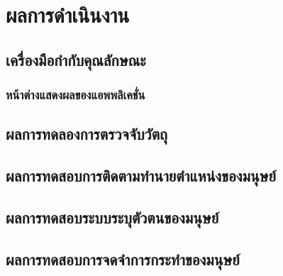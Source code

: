 \chapter{ผลการดำเนินงาน}
\section{เครื่องมือกำกับคุณลักษณะ}
\subsection{หน้าต่างแสดงผลของแอพพลิเคชั่น}


\clearpage
\section{ผลการทดลองการตรวจจับวัตถุ}

\clearpage
\section{ผลการทดสอบการติดตามทำนายตำแหน่งของมนุษย์}


\section{ผลการทดสอบระบบระบุตัวตนของมนุษย์}


\section{ผลการทดสอบการจดจำการกระทำของมนุษย์}


%

%